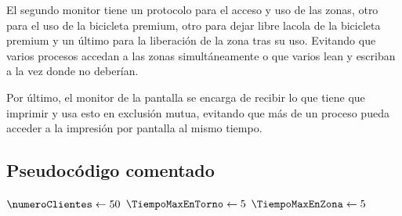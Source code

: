 \documentclass[a4paper,12pt,titlepage,oneside]{article}
\begin{document}
    El segundo monitor tiene un protocolo para el acceso y uso de las zonas, otro para el uso de la 
    bicicleta premium, otro para dejar libre lacola de la bicicleta premium y un último para la 
    liberación de la zona tras su uso. Evitando que varios procesos accedan a las zonas simultáneamente 
    o que varios lean y escriban a la vez donde no deberían.

    Por último, el monitor de la pantalla se encarga de recibir lo que tiene que imprimir y usa esto
    en exclusión mutua, evitando que más de un proceso pueda acceder a la impresión por pantalla
    al mismo tiempo.
    \newpage
    \subsection{Pseudocódigo comentado}
        \begin{algorithm}[H]
            \DontPrintSemicolon
            \SetAlgoLined





            \BlankLine
            $\numeroClientes \leftarrow 50$\;
            $\TiempoMaxEnTorno \leftarrow 5$\;
            $\TiempoMaxEnZona \leftarrow 5$\;

            

        \end{algorithm}
        
\end{document}
